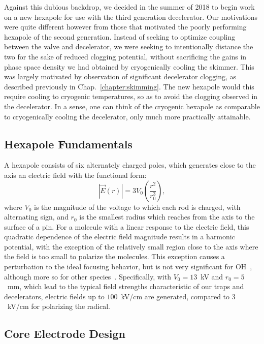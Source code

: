 Against this dubious backdrop, we decided in the summer of 2018 to begin work on a new hexapole for use with the third generation decelerator.
Our motivations were quite different however from those that motivated the poorly performing hexapole of the second generation.
Instead of seeking to optimize coupling between the valve and decelerator, we were seeking to intentionally distance the two for the sake of reduced clogging potential, without sacrificing the gains in phase space density we had obtained by cryogenically cooling the skimmer.
This was largely motivated by observation of significant decelerator clogging, as described previously in Chap.~\ref{chapter:skimming}.
The new hexapole would this require cooling to cryogenic temperatures, so as to avoid the clogging observed in the decelerator.
In a sense, one can think of the cryogenic hexapole as comparable to cryogenically cooling the decelerator, only much more practically attainable.

\subsection{Hexapole Fundamentals}

A hexapole consists of six alternately charged poles, which generates close to the axis an electric field with the functional form:
\begin{equation}
\left|\vec{E}(r)\right| = 3V_0\left(\frac{r^2}{r_0^3}\right),
\end{equation}
where $V_0$ is the magnitude of the voltage to which each rod is charged, with alternating sign, and $r_0$ is the smallest radius which reaches from the axis to the surface of a pin.
For a molecule with a linear response to the electric field, this quadratic dependence of the electric field magnitude results in a harmonic potential, with the exception of the relatively small region close to the axis where the field is too small to polarize the molecules.
This exception causes a perturbation to the ideal focusing behavior, but is not very significant for OH~\citep[Fig.~2b]{Bochinski2004}, although more so for other species~\citep[Fig.~1]{Kirste2013}.
Specifically, with $V_0=13$~kV and $r_0=5$~mm, which lead to the typical field strengths characteristic of our traps and decelerators, electric fields up to $100$~kV/cm are generated, compared to $3$~kV/cm for polarizing the radical.

\subsection{Core Electrode Design}

